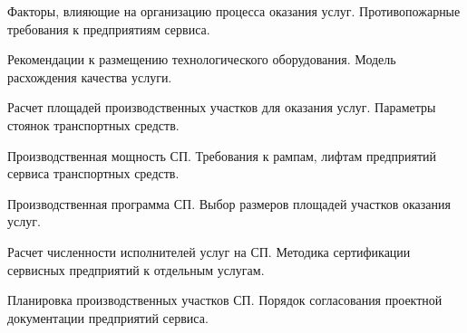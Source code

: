 \documentclass[
	14pt,
	a4paper,
	]
	{scrartcl}
\begin{document}
\vfill

\newpage


\shapk
{}
\setcounter{zad}{0}

\vfill
\z Факторы, влияющие на организацию процесса оказания услуг.
 \vfill
\z Противопожарные требования к предприятиям сервиса.
 \vfill

\vfill

\newpage


\shapk
{}
\setcounter{zad}{0}

\vfill
\z Рекомендации к размещению технологического оборудования.
 \vfill
\z Модель расхождения качества услуги.
 \vfill

\vfill

\newpage


\shapk
{}
\setcounter{zad}{0}

\vfill
\z Расчет площадей производственных участков для оказания услуг.
 \vfill
\z Параметры стоянок транспортных средств.
 \vfill

\vfill

\newpage


\shapk
{}
\setcounter{zad}{0}

\vfill
\z Производственная мощность СП.
 \vfill
\z Требования к рампам, лифтам предприятий сервиса транспортных средств.
 \vfill

\vfill

\newpage


\shapk
{}
\setcounter{zad}{0}

\vfill
\z Производственная программа СП.
 \vfill
\z Выбор размеров площадей участков оказания услуг.
 \vfill

\vfill

\newpage


\shapk
{}
\setcounter{zad}{0}

\vfill
\z Расчет численности исполнителей услуг на СП.
 \vfill
\z Методика сертификации сервисных предприятий к отдельным услугам.
 \vfill

\vfill

\newpage


\shapk
{}
\setcounter{zad}{0}

\vfill
\z Планировка производственных участков СП.
 \vfill
\z Порядок согласования проектной документации предприятий сервиса.
 \vfill

\vfill
\end{document}
